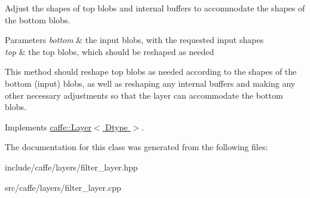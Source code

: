 Adjust the shapes of top blobs and internal buffers to accommodate the shapes of the bottom blobs. 


\begin{DoxyParams}{Parameters}
{\em bottom} & the input blobs, with the requested input shapes \\
\hline
{\em top} & the top blobs, which should be reshaped as needed\\
\hline
\end{DoxyParams}
This method should reshape top blobs as needed according to the shapes of the bottom (input) blobs, as well as reshaping any internal buffers and making any other necessary adjustments so that the layer can accommodate the bottom blobs. 

Implements \hyperlink{classcaffe_1_1Layer_ad9d391b972c769c0ebee34ca6d1c973e}{caffe\+::\+Layer$<$ Dtype $>$}.



The documentation for this class was generated from the following files\+:\begin{DoxyCompactItemize}
\item 
include/caffe/layers/filter\+\_\+layer.\+hpp\item 
src/caffe/layers/filter\+\_\+layer.\+cpp\end{DoxyCompactItemize}
